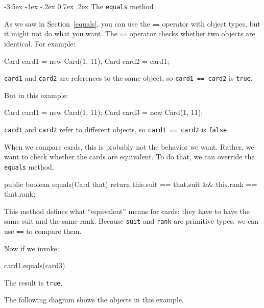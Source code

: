 \documentclass[12pt]{book}
\makeatletter
\theoremstyle{exercise}
\newcommand{\java}[1]{\verb"#1"}
\renewcommand{\section}{\@startsection{section}{1}{\z@}%
    {-3.5ex \@plus -1ex \@minus -.2ex}%
    {0.7ex \@plus.2ex}%
    {\normalfont\Large\bfseries}}
\newcommand{\java}[1]{\lstinline{#1}} %
\makeatother
\begin{document}
\section{The \java{equals} method}
\label{equivalence}

As we saw in Section~\ref{equals}, you can use the \java{==} operator with object types, but it might not do what you want.
The \java{==} operator checks whether two objects are identical.
For example:


\begin{code}
    Card card1 = new Card(1, 11);
    Card card2 = card1;
\end{code}

\java{card1} and \java{card2} are references to the same object, so \java{card1 == card2} is \java{true}.

But in this example:

\begin{code}
    Card card1 = new Card(1, 11);
    Card card3 = new Card(1, 11);
\end{code}

\java{card1} and \java{card2} refer to different objects, so \java{card1 == card2} is \java{false}.

When we compare cards, this is probably not the behavior we want.
Rather, we want to check whether the cards are equivalent.
To do that, we can override the \java{equals} method.


\begin{code}
    public boolean equals(Card that) {
        return this.suit == that.suit && this.rank == that.rank;
    }
\end{code}

This method defines what ``equivalent'' means for cards: they have to have the same suit and the same rank.
Because \java{suit} and \java{rank} are primitive types, we can use \java{==} to compare them.

Now if we invoke:

\begin{code}
  card1.equals(card3)
\end{code}

The result is \java{true}.

The following diagram shows the objects in this example.

\end{document}
